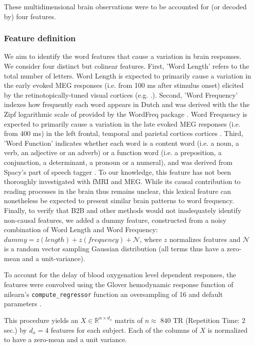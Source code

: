 These multidimensional brain observations were to be accounted for (or decoded by) four features.

\subsubsection{Feature definition}

We aim to identify the word features that cause a variation in brain responses. We consider four distinct but colinear features.
%
First, 'Word Length' refers to the total number of letters. Word Length is expected to primarily cause a variation in the early evoked MEG responses (i.e. from 100 ms after stimulus onset) elicited by the retinotopically-tuned visual cortices (e.g. \citep{pegado2014timing}.).
%
Second, 'Word Frequency' indexes how frequently each word appears in Dutch and
was derived with the the Zipf logarithmic scale of \citep{van2014subtlex}
provided by the WordFreq package \citep{speerwordfreq}. Word Frequency is
expected to primarily cause a variation in the late evoked MEG responses (i.e.
from 400 ms) in the left frontal, temporal and parietal cortices
cortices \citep{kutas2011thirty,mccandliss2003visual}.
%
Third, 'Word Function' indicates whether each word is a content word (i.e. a
noun, a verb, an adjective or an adverb) or a function word (i.e. a preposition,
a conjunction, a determinant, a pronoun or a numeral), and was derived from
Spacy's part of speech tagger \citep{spacy2}. To our knowledge, this feature has
not been thoroughly investigated with fMRI and MEG. While its causal contribution to
reading processes in the brain thus remains unclear, this lexical feature can
nonetheless be expected to present similar brain patterns to word frequency.
%
Finally, to verify that B2B and other methods would not inadequately identify non-causal features, we added a dummy feature, constructed from a noisy combination of Word Length and Word Frequency:
$dummy = z(length) + z(frequency) + \mathcal{N}$, where $z$ normalizes features
and $\mathcal{N}$ is a random vector sampling Gaussian distribution (all terms
thus have a zero-mean and a unit-variance).

To account for the delay of blood oxygenation level dependent responses, the
features were convolved using the Glover hemodynamic response function
of nilearn's \texttt{compute\_regressor} function an oversampling of 16 and default parameters \citep{nilearn}.

This procedure yields an $X \in \mathbb{R}^{n \times d_x}$ matrix of $n\approx$
840 TR (Repetition Time: 2 sec.) by
$d_x=4$ features for each subject. Each of the columns of $X$ is normalized to
have a zero-mean and a unit variance.


